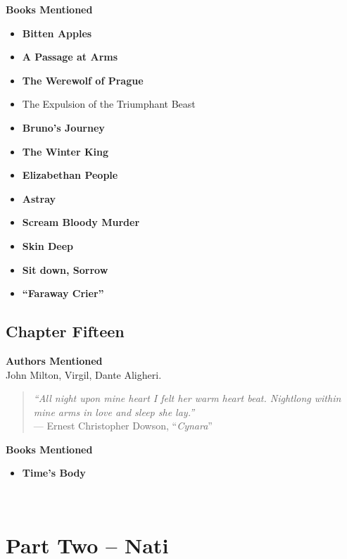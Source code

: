 \documentclass[twoside,10pt]{report}
\newcommand\fleuron{\begin{turn}{45}\Large \ding{166}\end{turn}}
\newcommand\doublefleuron{%
	\reflectbox{\fleuron}\AC\staveXLIX\reflectbox{\AC}\fleuron}
\newcommand\fleuronbar{%
	{\huge\LinearACCCXIII}\xrfill[1.3ex]{1pt}\doublefleuron\xrfill[1.3ex]{1pt}\reflectbox{\huge\LinearACCCXIII}}
\newcommand\nbvspace[1][3]{\vspace*{\stretch{#1}}}
\begin{document}
\textbf{Books Mentioned}
\begin{itemize}
\item \textbf{Bitten Apples} \cite{Craft}
\item \textbf{A Passage at Arms} \cite{Crafta}
\item \textbf{The Werewolf of Prague} \cite{CraftW1}
\item The Expulsion of the Triumphant Beast \cite{Bruno1964}
\item \textbf{Bruno’s Journey} \cite{Craft1931}
\item \textbf{The Winter King} \cite{Craft1941}
\item \textbf{Elizabethan People} \cite{Craft1953}
\item \textbf{Astray} \cite{Craft1959}
\item \textbf{Scream Bloody Murder} \cite{Craft1939}
\item \textbf{Skin Deep} \cite{Craftb}
\item \textbf{Sit down, Sorrow} \cite{Craft1960}
\item \textbf{``Faraway Crier''} \cite{faraway}
\end{itemize}


\section{Chapter Fifteen}
\textbf{Authors Mentioned}\\
John Milton, Virgil, Dante Aligheri.
\\
\begin{quote}
\textit{``All night upon mine heart I felt her warm heart beat. Nightlong within mine arms in love and sleep she lay.''}\\
--- Ernest Christopher Dowson, ``\textit{Cynara}''
\end{quote}

\textbf{Books Mentioned}
\begin{itemize}
\item \textbf{Time's Body} \cite{Barr}
\end{itemize}

\begin{center}
\vfill
\shadowoffset{1pt}
\shadowtext{%
{\color{Mahogany}\fontsize{50}{54}\staveLII}}\\
\nbvspace[1]
\end{center}

\chapter{Part Two -- Nati}
\end{document}
